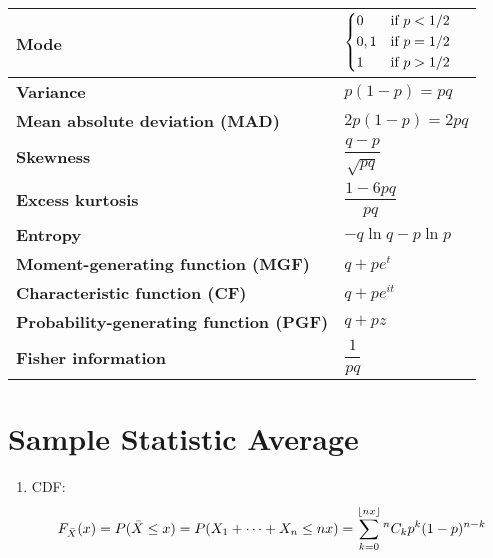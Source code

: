 \begin{customTableWrapper}{2}
\begin{longtable}{|m{6cm}|p{9cm}|}
    \textbf{Mode} & 
    ${\displaystyle {\begin{dcases}0&{\text{if }}p<1/2\\0,1&{\text{if }}p=1/2\\1&{\text{if }}p>1/2\end{dcases}}}$
    \\ \hline

    \textbf{Variance} &
    ${\displaystyle p(1-p)=pq}$
    \\ \hline

    \textbf{Mean absolute deviation (MAD)} &
    ${\displaystyle 2p(1-p)=2pq}$
    \\[1ex] \hline

    \textbf{Skewness} &
    ${\displaystyle {\dfrac {q-p}{\sqrt {pq}}}}$
    \\ \hline

    \textbf{Excess kurtosis} &
    ${\displaystyle {\dfrac {1-6pq}{pq}}}$
    \\ \hline

    \textbf{Entropy} &
    ${\displaystyle -q\ln q-p\ln p}$
    \\[1ex] \hline

    \textbf{Moment-generating function (MGF)} &
    ${\displaystyle q+pe^{t}}$
    \\[1ex] \hline

    \textbf{Characteristic function (CF)} &
    ${\displaystyle q+pe^{it}}$
    \\[1ex] \hline

    \textbf{Probability-generating function (PGF)} &
    ${\displaystyle q+pz}$
    \\[1ex] \hline

    \textbf{Fisher information} &
    ${\displaystyle {\dfrac {1}{pq}}}$
    \\[1ex] \hline


\end{longtable}
\end{customTableWrapper}

\section{Sample Statistic Average \cite{ism-1}} \label{Bernoulli Distribution: Sample Statistic Average}

\begin{enumerate}
    \item CDF:
    \[
        F_{\bar{X}}(x)
        = P(\bar{X} \leq x)
        = P(X_1 + \cdots + X_n \leq nx)
        = \displaystyle\sum_{k=0}^{\left \lfloor nx \right \rfloor} {^n}C_k p^k (1-p)^{n-k}
    \]

\end{enumerate}

